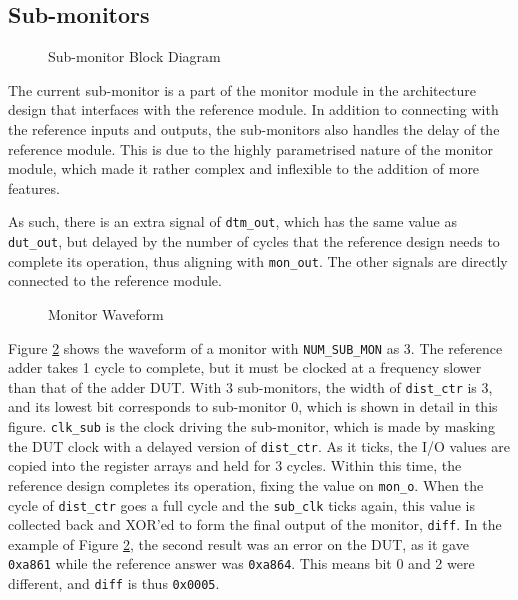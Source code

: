 \subsection{Sub-monitors}

\begin{figure}[H]
  \centering
  
  \caption{Sub-monitor Block Diagram}
  \label{SubmonBlk}
\end{figure}

The current sub-monitor is a part of the monitor module in the architecture design that interfaces with the reference module.
In addition to connecting with the reference inputs and outputs, the sub-monitors also handles the delay of the reference module.
This is due to the highly parametrised nature of the monitor module, which made it rather complex and inflexible to the addition of more features.

As such, there is an extra signal of \texttt{dtm\_out}, which has the same value as \texttt{dut\_out}, but delayed by the number of cycles that the reference design needs to complete its operation, thus aligning with \texttt{mon\_out}.
The other signals are directly connected to the reference module.

\begin{figure}[H]
  \centering
  
  \caption{Monitor Waveform}
  \label{MonitorWave}
\end{figure}

Figure \ref{MonitorWave} shows the waveform of a monitor with \texttt{NUM\_SUB\_MON} as 3.
The reference adder takes 1 cycle to complete, but it must be clocked at a frequency slower than that of the adder DUT.
With 3 sub-monitors, the width of \texttt{dist\_ctr} is 3, and its lowest bit corresponds to sub-monitor 0, which is shown in detail in this figure.
\texttt{clk\_sub} is the clock driving the sub-monitor, which is made by masking the DUT clock with a delayed version of \texttt{dist\_ctr}.
As it ticks, the I/O values are copied into the register arrays and held for 3 cycles.
Within this time, the reference design completes its operation, fixing the value on \texttt{mon\_o}.
When the cycle of \texttt{dist\_ctr} goes a full cycle and the \texttt{sub\_clk} ticks again, this value is collected back and XOR'ed to form the final output of the monitor, \texttt{diff}.
In the example of Figure \ref{MonitorWave}, the second result was an error on the DUT, as it gave \texttt{0xa861} while the reference answer was \texttt{0xa864}.
This means bit 0 and 2 were different, and \texttt{diff} is thus \texttt{0x0005}.

